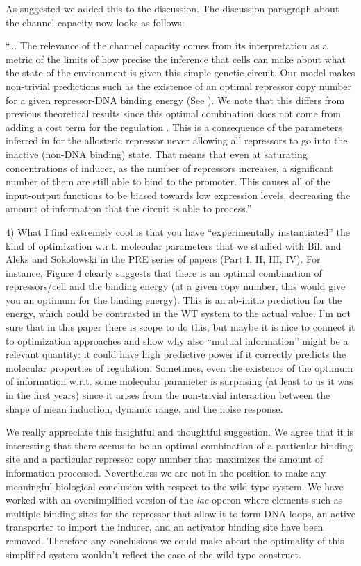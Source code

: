 As suggested we added this to the discussion. The discussion paragraph about the
channel capacity now looks as follows:

``... The relevance of the channel capacity comes from its interpretation as a
metric of the limits of how precise the inference that cells can make about what
the state of the environment is given this simple genetic circuit. Our model
makes non-trivial predictions such as the existence of an optimal repressor copy
number for a given repressor-DNA binding energy (See ). We
note that this differs from previous theoretical results since this optimal
combination does not come from adding a cost term for the regulation
\cite{Tkacik2011}. This is a consequence of the parameters inferred in
\cite{Razo-Mejia2018} for the allosteric repressor never allowing all repressors
to go into the inactive (non-DNA binding) state. That means that even at
saturating concentrations of inducer, as the number of repressors increases, a
significant number of them are still able to bind to the promoter. This causes
all of the input-output functions to be biased towards low expression levels,
decreasing the amount of information that the circuit is able to process.''

\begin{tcolorbox}
4) What I find extremely cool is that you have “experimentally instantiated” the
kind of optimization w.r.t. molecular parameters that we studied with Bill and
Aleks and Sokolowski in the PRE series of papers (Part I, II, III, IV). For
instance, Figure 4 clearly suggests that there is an optimal combination of
repressors/cell and the binding energy (at a given copy number, this would give
you an optimum for the binding energy). This is an ab-initio prediction for the
energy, which could be contrasted in the WT system to the actual value. I’m not
sure that in this paper there is scope to do this, but maybe it is nice to
connect it to optimization approaches and show why also “mutual information”
might be a relevant quantity: it could have high predictive power if it
correctly predicts the molecular properties of regulation. Sometimes, even the
existence of the optimum of information w.r.t. some molecular parameter is
surprising (at least to us it was in the first years) since it arises from the
non-trivial interaction between the shape of mean induction, dynamic range, and
the noise response.
\end{tcolorbox}

We really appreciate this insightful and thoughtful suggestion. We agree that it
is interesting that there seems to be an optimal combination of a particular
binding site and a particular repressor copy number that maximizes the amount of
information processed. Nevertheless we are not in the position to make any
meaningful biological conclusion with respect to the wild-type system. We have
worked with an oversimplified version of the {\it lac} operon where elements
such as multiple binding sites for the repressor that allow it to form DNA
loops, an active transporter to import the inducer, and an activator binding
site have been removed. Therefore any conclusions we could make about the
optimality of this simplified system wouldn't reflect the case of the wild-type
construct.

